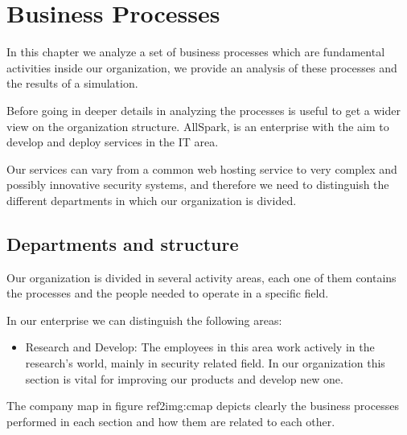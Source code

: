 \chapter{Business Processes}
In this chapter we analyze a set of business processes which are
fundamental activities inside our organization, we provide an analysis of
these processes and the results of a simulation.

Before going in deeper details in analyzing the processes is useful to get
a wider view on the organization structure.
AllSpark, is an enterprise with the aim to develop and deploy services in
the IT area.

Our services can vary from a common web hosting service to very complex and
possibly innovative security systems, and therefore we need to distinguish
the different departments in which our organization is divided.

\section{Departments and structure}
Our organization is divided in several activity areas, each one of them
contains the processes and the people needed to operate in a specific
field.

In our enterprise we can distinguish the following areas:
\begin{itemize}
\item{Research and Develop:} The employees in this area work actively in
the research's world, mainly in security related field. In our organization
this section is vital for improving our products and develop new one.
\end{itemize}

The company map in figure ref{2img:cmap} depicts clearly the business processes
performed in each section and how them are related to each other.

